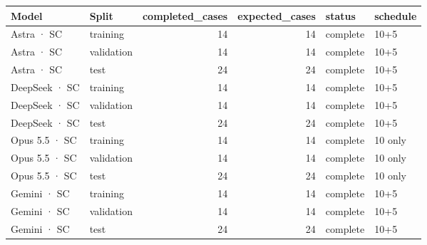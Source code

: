 \begin{tabular}{llrrll}
\toprule
Model & Split & completed\_cases & expected\_cases & status & schedule \\
\midrule
Astra · SC & training & 14 & 14 & complete & 10+5 \\
Astra · SC & validation & 14 & 14 & complete & 10+5 \\
Astra · SC & test & 24 & 24 & complete & 10+5 \\
DeepSeek · SC & training & 14 & 14 & complete & 10+5 \\
DeepSeek · SC & validation & 14 & 14 & complete & 10+5 \\
DeepSeek · SC & test & 24 & 24 & complete & 10+5 \\
Opus 5.5 · SC & training & 14 & 14 & complete & 10 only \\
Opus 5.5 · SC & validation & 14 & 14 & complete & 10 only \\
Opus 5.5 · SC & test & 24 & 24 & complete & 10 only \\
Gemini · SC & training & 14 & 14 & complete & 10+5 \\
Gemini · SC & validation & 14 & 14 & complete & 10+5 \\
Gemini · SC & test & 24 & 24 & complete & 10+5 \\
\bottomrule
\end{tabular}
